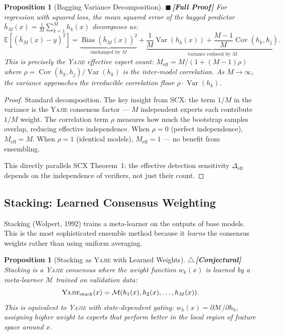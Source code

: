 \documentclass[12pt,a4paper]{article}
\newtheorem{proposition}[theorem]{Proposition}
\theoremstyle{definition}
\newcommand{\rigorFull}{{\color{rigorcolor}$\blacksquare$\,\textbf{[Full Proof]}}}
\newcommand{\rigorConjectural}{{\color{red!70!black}$\triangle$\,\textbf{[Conjectural]}}}
\newcommand{\Yajie}{\textsc{Yajie}}
\newcommand{\SCX}{\textsc{SCX}}
\DeclareMathOperator{\Var}{Var}
\DeclareMathOperator{\Cov}{Cov}
\DeclareMathOperator{\Bias}{Bias}
\newcommand{\E}{\mathbb{E}}
\newcommand{\cM}{\mathcal{M}}
\begin{document}
\begin{proposition}[Bagging Variance Decomposition]\label{prop:bagging_var}
\rigorFull
For regression with squared loss, the mean squared error of the bagged predictor $\bar{h}_M(x) = \frac{1}{M}\sum_{k=1}^M h_k(x)$ decomposes as:
\begin{equation}\label{eq:bagging_decomp}
    \E[(\bar{h}_M(x) - y)^2] = \underbrace{\Bias(\bar{h}_M(x))^2}_{\text{unchanged by } M} + \underbrace{\frac{1}{M}\Var(h_k(x)) + \frac{M-1}{M}\Cov(h_k, h_j)}_{\text{variance reduced by } M}.
\end{equation}
This is precisely the \Yajie{} effective expert count: $M_{\text{eff}} = M / (1 + (M-1)\rho)$ where $\rho = \Cov(h_k, h_j)/\Var(h_k)$ is the inter-model correlation. As $M \to \infty$, the variance approaches the irreducible correlation floor $\rho \cdot \Var(h_k)$.
\end{proposition}

\begin{proof}
Standard decomposition. The key insight from \SCX{}: the term $1/M$ in the variance is the \Yajie{} consensus factor — $M$ independent experts each contribute $1/M$ weight. The correlation term $\rho$ measures how much the bootstrap samples overlap, reducing effective independence. When $\rho = 0$ (perfect independence), $M_{\text{eff}} = M$. When $\rho = 1$ (identical models), $M_{\text{eff}} = 1$ — no benefit from ensembling.

This directly parallels \SCX{} Theorem~1: the effective detection sensitivity $\Delta_{\text{eff}}$ depends on the independence of verifiers, not just their count.
\end{proof}

\subsection{Stacking: Learned Consensus Weighting}

Stacking (Wolpert, 1992) trains a meta-learner on the outputs of base models. This is the most sophisticated ensemble method because it \emph{learns} the consensus weights rather than using uniform averaging.

\begin{proposition}[Stacking as \Yajie{} with Learned Weights]\label{prop:stacking_yajie}
\rigorConjectural
Stacking is a \Yajie{} consensus where the weight function $w_k(x)$ is learned by a meta-learner $\cM$ trained on validation data:
\begin{equation}\label{eq:stacking}
    \Yajie_{\text{stack}}(x) = \cM(h_1(x), h_2(x), \ldots, h_M(x)).
\end{equation}
This is equivalent to \Yajie{} with state-dependent gating: $w_k(x) = \partial \cM / \partial h_k$, assigning higher weight to experts that perform better in the local region of feature space around $x$.
\end{proposition}
\end{document}
